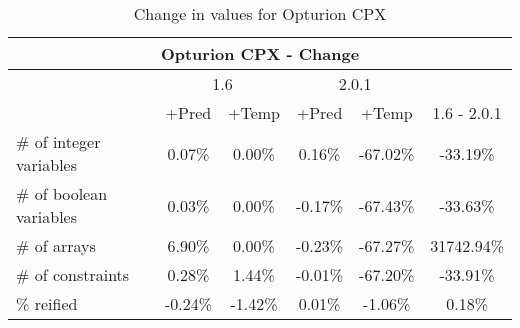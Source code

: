 \documentclass{standalone}
\begin{document}
\begin{table}[H]
\footnotesize
\centering
\begin{tabular}{lc|c|c|c|c}
\multicolumn{6}{c}{Opturion CPX - Change} \\ 
\hline\hline  & \multicolumn{2}{c|}{1.6} &\multicolumn{2}{c|}{2.0.1} &\\ 
\hline  & +Pred & +Temp & +Pred & +Temp & 1.6 - 2.0.1\\
\# of integer variables & 0.07\% & 0.00\% & 0.16\% & -67.02\% & -33.19\% \\ 
\# of boolean variables & 0.03\% & 0.00\% & -0.17\% & -67.43\% & -33.63\% \\ 
\# of arrays            & 6.90\% & 0.00\% & -0.23\% & -67.27\% & 31742.94\% \\
\# of constraints       & 0.28\% & 1.44\% & -0.01\% & -67.20\% & -33.91\% \\ 
\% reified               & -0.24\% & -1.42\% & 0.01\% & -1.06\% & 0.18\%\\ 
\end{tabular}\caption{Change in values for Opturion CPX}
\end{table}
\end{document}
